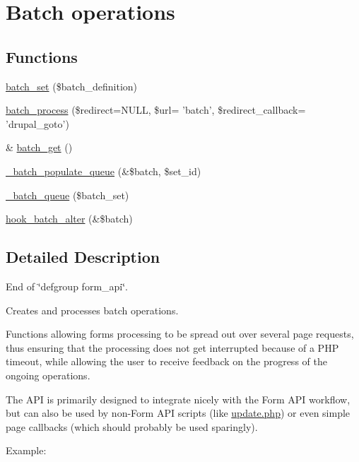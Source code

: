 \hypertarget{group__batch}{
\section{Batch operations}
\label{group__batch}
}
\subsection*{Functions}
\begin{DoxyCompactItemize}
\item 
\hyperlink{group__batch_ga9ff3f18b3bdd1d62ab7ac681a22a7170}{batch\_\-set} (\$batch\_\-definition)
\item 
\hyperlink{group__batch_gab17f59692632a482cee4f65f27d082f7}{batch\_\-process} (\$redirect=NULL, \$url= 'batch', \$redirect\_\-callback= 'drupal\_\-goto')
\item 
\& \hyperlink{group__batch_ga971f5246c6e8e536d0b20529fb2e2638}{batch\_\-get} ()
\item 
\hyperlink{group__batch_gaac34897148f5ea89ce15f4f95c34557e}{\_\-batch\_\-populate\_\-queue} (\&\$batch, \$set\_\-id)
\item 
\hyperlink{group__batch_ga93c80df7641ba3be8bc535a9c1fd13c2}{\_\-batch\_\-queue} (\$batch\_\-set)
\item 
\hyperlink{group__batch_ga135f2f5d27bc51f905cf9f36bde06a2e}{hook\_\-batch\_\-alter} (\&\$batch)
\end{DoxyCompactItemize}


\subsection{Detailed Description}
End of \char`\"{}defgroup form\_\-api\char`\"{}.

Creates and processes batch operations.

Functions allowing forms processing to be spread out over several page requests, thus ensuring that the processing does not get interrupted because of a PHP timeout, while allowing the user to receive feedback on the progress of the ongoing operations.

The API is primarily designed to integrate nicely with the Form API workflow, but can also be used by non-\/Form API scripts (like \hyperlink{update_8php}{update.php}) or even simple page callbacks (which should probably be used sparingly).

Example: 


